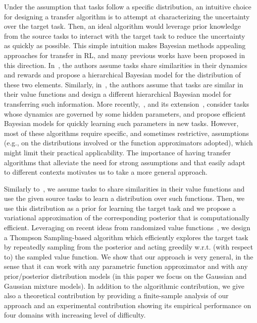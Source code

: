 \documentclass{article}
\begin{document}
Under the assumption that tasks follow a specific distribution, an intuitive choice for designing a transfer algorithm is to attempt at characterizing the uncertainty over the target task. Then, an ideal algorithm would leverage prior knowledge from the source tasks to interact with the target task to reduce the uncertainty as quickly as possible. This simple intuition makes Bayesian methods appealing approaches for transfer in RL, and many previous works have been proposed in this direction. In~\cite{wilson2007multi}, the authors assume tasks share similarities in their dynamics and rewards and propose a hierarchical Bayesian model for the distribution of these two elements. Similarly, in~\cite{lazaric2010bayesian}, the authors assume that tasks are similar in their value functions and design a different hierarchical Bayesian model for transferring such information. More recently,~\cite{doshi2016hidden}, and its extension~\cite{killian2017robust}, consider tasks whose dynamics are governed by some hidden parameters, and propose efficient Bayesian models for quickly learning such parameters in new tasks. However, most of these algorithms require specific, and sometimes restrictive, assumptions (e.g., on the distributions involved or the function approximators adopted), which might limit their practical applicability. The importance of having transfer algorithms that alleviate the need for strong assumptions and that easily adapt to different contexts motivates us to take a more general approach.

Similarly to~\cite{lazaric2010bayesian}, we assume tasks to share similarities in their value functions and use the given source tasks to learn a distribution over such functions. Then, we use this distribution as a prior for learning the target task and we propose a variational approximation of the corresponding posterior that is computationally efficient. Leveraging on recent ideas from randomized value functions~\cite{osband2014generalization}, we design a Thompson Sampling-based algorithm which efficiently explores the target task by repeatedly sampling from the posterior and acting greedily w.r.t. (with respect to) the sampled value function. We show that our approach is very general, in the sense that it can work with any parametric function approximator and with any prior/posterior distribution models (in this paper we focus on the Gaussian and Gaussian mixture models). In addition to the algorithmic contribution, we give also a theoretical contribution by providing a finite-sample analysis of our approach and an experimental contribution showing its empirical performance on four domains with increasing level of difficulty.
\end{document}
